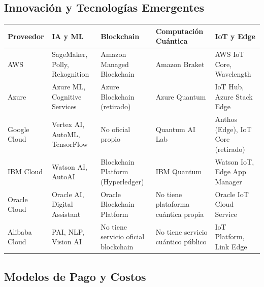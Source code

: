{\begin{landscape}
            \subsection{Innovación y Tecnologías Emergentes}
                \begin{tabularx}{\linewidth}{|X|X|X|X|X|}
                    \hline
                    \textbf{Proveedor} & \textbf{IA y ML} & \textbf{Blockchain} & \textbf{Computación Cuántica} & \textbf{IoT y Edge} \\
                    \hline
                    AWS & SageMaker, Polly, Rekognition & Amazon Managed Blockchain & Amazon Braket & AWS IoT Core, Wavelength \\
                    \hline
                    Azure & Azure ML, Cognitive Services & Azure Blockchain (retirado) & Azure Quantum & IoT Hub, Azure Stack Edge \\
                    \hline
                    Google Cloud & Vertex AI, AutoML, TensorFlow & No oficial propio & Quantum AI Lab & Anthos (Edge), IoT Core (retirado) \\
                    \hline
                    IBM Cloud & Watson AI, AutoAI & Blockchain Platform (Hyperledger) & IBM Quantum & Watson IoT, Edge App Manager \\
                    \hline
                    Oracle Cloud & Oracle AI, Digital Assistant & Oracle Blockchain Platform & No tiene plataforma cuántica propia & Oracle IoT Cloud Service \\
                    \hline
                    Alibaba Cloud & PAI, NLP, Vision AI & No tiene servicio oficial blockchain & No tiene servicio cuántico público & IoT Platform, Link Edge \\
                    \hline
                \end{tabularx}
        \end{landscape}
        
        \begin{landscape}
            \subsection{Modelos de Pago y Costos}
        

\end{landscape}}
